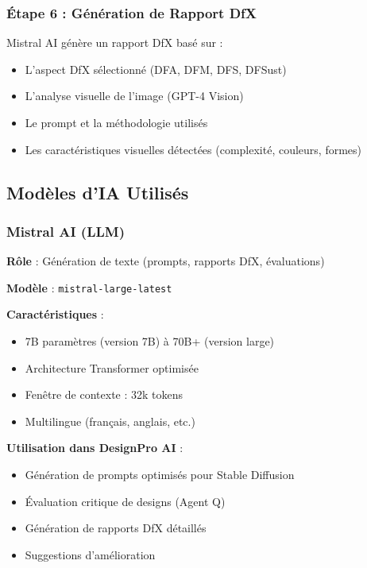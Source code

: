 \subsubsection{Étape 6 : Génération de Rapport DfX}

Mistral AI génère un rapport DfX basé sur :
\begin{itemize}[leftmargin=*]
    \item L'aspect DfX sélectionné (DFA, DFM, DFS, DFSust)
    \item L'analyse visuelle de l'image (GPT-4 Vision)
    \item Le prompt et la méthodologie utilisés
    \item Les caractéristiques visuelles détectées (complexité, couleurs, formes)
\end{itemize}

\subsection{Modèles d'IA Utilisés}

\subsubsection{Mistral AI (LLM)}

\textbf{Rôle} : Génération de texte (prompts, rapports DfX, évaluations)

\textbf{Modèle} : \texttt{mistral-large-latest}

\textbf{Caractéristiques} :
\begin{itemize}[leftmargin=*]
    \item 7B paramètres (version 7B) à 70B+ (version large)
    \item Architecture Transformer optimisée
    \item Fenêtre de contexte : 32k tokens
    \item Multilingue (français, anglais, etc.)
\end{itemize}

\textbf{Utilisation dans DesignPro AI} :
\begin{itemize}[leftmargin=*]
    \item Génération de prompts optimisés pour Stable Diffusion
    \item Évaluation critique de designs (Agent Q)
    \item Génération de rapports DfX détaillés
    \item Suggestions d'amélioration
\end{itemize}

